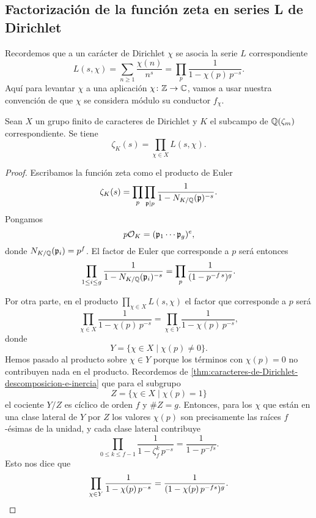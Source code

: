 \subsection{Factorización de la función zeta en series L de Dirichlet}

Recordemos que a un carácter de Dirichlet $\chi$ se asocia la serie $L$
correspondiente
\[ L (s,\chi) = \sum_{n\ge 1} \frac{\chi(n)}{n^s} =
   \prod_p \frac{1}{1 - \chi(p)\,p^{-s}}. \]
Aquí para levantar $\chi$ a una aplicación $\chi\colon \mathbb{Z}\to \mathbb{C}$, vamos a
usar nuestra convención de que $\chi$ se considera módulo su conductor $f_\chi$.

\begin{teorema}
  Sean $X$ un grupo finito de caracteres de Dirichlet y $K$ el subcampo de
  $\mathbb{Q} (\zeta_m)$ correspondiente. Se tiene
  $$\zeta_K (s) = \prod_{\chi\in X} L (s,\chi).$$

  \begin{proof}
    Escribamos la función zeta como el producto de Euler
    $$\zeta_K (s) = \prod_p \prod_{\mathfrak{p}\mid p} \frac{1}{1 - N_{K/\mathbb{Q}} (\mathfrak{p})^{-s}}.$$
    Pongamos
    $$p\mathcal{O}_K = (\mathfrak{p}_1\cdots\mathfrak{p}_g)^e,$$
    donde $N_{K/\mathbb{Q}} (\mathfrak{p}_i) = p^f$. El factor de Euler que corresponde
    a $p$ será entonces
    $$\prod_{1 \le i \le g} \frac{1}{1 - N_{K/\mathbb{Q}} (\mathfrak{p}_i)^{-s}} = \prod_p \frac{1}{(1 - p^{-f \,s})^g}.$$

    Por otra parte, en el producto $\prod_{\chi\in X} L (s,\chi)$ el factor que
    corresponde a $p$ será
    \[ \prod_{\chi\in X} \frac{1}{1 - \chi (p)\,p^{-s}} =
       \prod_{\chi\in Y} \frac{1}{1 - \chi (p)\,p^{-s}}, \]
    donde
    $$Y = \{ \chi \in X \mid \chi (p) \ne 0 \}.$$
    Hemos pasado al producto sobre $\chi \in Y$ porque los términos con
    $\chi (p) = 0$ no contribuyen nada en el producto. Recordemos
    de \ref{thm:caracteres-de-Dirichlet-descomposicion-e-inercia} que para
    el subgrupo
    $$Z = \{ \chi \in X \mid \chi (p) = 1 \}$$
    el cociente $Y/Z$ es cíclico de orden $f$ y $\# Z = g$. Entonces,
    para los $\chi$ que están en una clase lateral de $Y$ por $Z$ los valores
    $\chi (p)$ son precisamente las raíces $f$-ésimas de la unidad, y cada
    clase lateral contribuye
    $$\prod_{0 \le k \le f-1} \frac{1}{1 - \zeta_f^k\,p^{-s}} = \frac{1}{1 - p^{-fs}}.$$
    Esto nos dice que
    \[ \prod_{\chi\in Y} \frac{1}{1 - \chi (p)\,p^{-s}} =
       \frac{1}{(1 - \chi (p)\,p^{-fs})^g}. \qedhere \]
  \end{proof}
\end{teorema}

